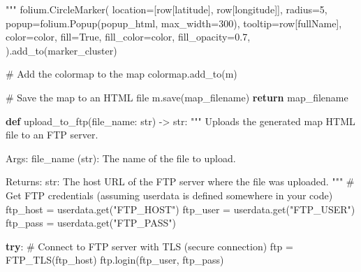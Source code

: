 \documentclass[
  letterpaper,
  DIV=11,
  numbers=noendperiod]{scrartcl}
\newenvironment{Shaded}{\begin{snugshade}}{\end{snugshade}}
\newcommand{\BuiltInTok}[1]{\textcolor[rgb]{0.00,0.23,0.31}{#1}}
\newcommand{\CommentTok}[1]{\textcolor[rgb]{0.37,0.37,0.37}{#1}}
\newcommand{\ControlFlowTok}[1]{\textcolor[rgb]{0.00,0.23,0.31}{\textbf{#1}}}
\newcommand{\DecValTok}[1]{\textcolor[rgb]{0.68,0.00,0.00}{#1}}
\newcommand{\FloatTok}[1]{\textcolor[rgb]{0.68,0.00,0.00}{#1}}
\newcommand{\KeywordTok}[1]{\textcolor[rgb]{0.00,0.23,0.31}{\textbf{#1}}}
\newcommand{\NormalTok}[1]{\textcolor[rgb]{0.00,0.23,0.31}{#1}}
\newcommand{\OperatorTok}[1]{\textcolor[rgb]{0.37,0.37,0.37}{#1}}
\newcommand{\SpecialStringTok}[1]{\textcolor[rgb]{0.13,0.47,0.30}{#1}}
\newcommand{\StringTok}[1]{\textcolor[rgb]{0.13,0.47,0.30}{#1}}
\newcommand{\VariableTok}[1]{\textcolor[rgb]{0.07,0.07,0.07}{#1}}
\begin{document}
\begin{Shaded}
\begin{Highlighting}[]
\SpecialStringTok{        """}
\NormalTok{        folium.CircleMarker(}
\NormalTok{            location}\OperatorTok{=}\NormalTok{[row[}\StringTok{\textquotesingle{}latitude\textquotesingle{}}\NormalTok{], row[}\StringTok{\textquotesingle{}longitude\textquotesingle{}}\NormalTok{]],}
\NormalTok{            radius}\OperatorTok{=}\DecValTok{5}\NormalTok{,}
\NormalTok{            popup}\OperatorTok{=}\NormalTok{folium.Popup(popup\_html, max\_width}\OperatorTok{=}\DecValTok{300}\NormalTok{),}
\NormalTok{            tooltip}\OperatorTok{=}\NormalTok{row[}\StringTok{\textquotesingle{}fullName\textquotesingle{}}\NormalTok{],}
\NormalTok{            color}\OperatorTok{=}\NormalTok{color,}
\NormalTok{            fill}\OperatorTok{=}\VariableTok{True}\NormalTok{,}
\NormalTok{            fill\_color}\OperatorTok{=}\NormalTok{color,}
\NormalTok{            fill\_opacity}\OperatorTok{=}\FloatTok{0.7}\NormalTok{,}
\NormalTok{        ).add\_to(marker\_cluster)}

    \CommentTok{\# Add the colormap to the map}
\NormalTok{    colormap.add\_to(m)}

    \CommentTok{\# Save the map to an HTML file}
\NormalTok{    m.save(map\_filename)}
    \ControlFlowTok{return}\NormalTok{ map\_filename}

\KeywordTok{def}\NormalTok{ upload\_to\_ftp(file\_name: }\BuiltInTok{str}\NormalTok{) }\OperatorTok{{-}\textgreater{}} \BuiltInTok{str}\NormalTok{:}
    \CommentTok{"""}
\CommentTok{    Uploads the generated map HTML file to an FTP server.}

\CommentTok{    Args:}
\CommentTok{        file\_name (str): The name of the file to upload.}

\CommentTok{    Returns:}
\CommentTok{        str: The host URL of the FTP server where the file was uploaded.}
\CommentTok{    """}
    \CommentTok{\# Get FTP credentials (assuming \textquotesingle{}userdata\textquotesingle{} is defined somewhere in your code)}
\NormalTok{    ftp\_host }\OperatorTok{=}\NormalTok{ userdata.get(}\StringTok{"FTP\_HOST"}\NormalTok{)}
\NormalTok{    ftp\_user }\OperatorTok{=}\NormalTok{ userdata.get(}\StringTok{"FTP\_USER"}\NormalTok{)}
\NormalTok{    ftp\_pass }\OperatorTok{=}\NormalTok{ userdata.get(}\StringTok{"FTP\_PASS"}\NormalTok{)}

    \ControlFlowTok{try}\NormalTok{:}
        \CommentTok{\# Connect to FTP server with TLS (secure connection)}
\NormalTok{        ftp }\OperatorTok{=}\NormalTok{ FTP\_TLS(ftp\_host)}
\NormalTok{        ftp.login(ftp\_user, ftp\_pass)}


\end{Highlighting}
\end{Shaded}
\end{document}
